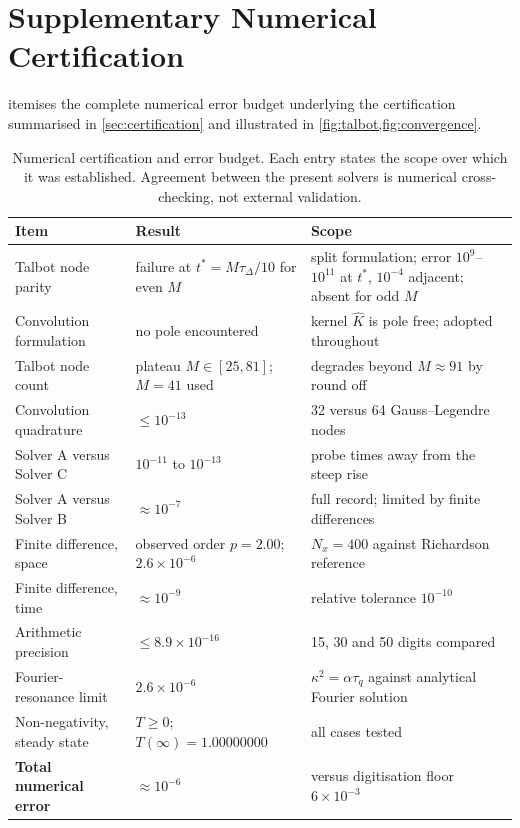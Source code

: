 \documentclass[preprint,12pt,a4paper]{elsarticle}
\theoremstyle{plain}
\theoremstyle{definition}
\theoremstyle{remark}
\newcommand{\tq}{\tau_{q}}
\newcommand{\kk}{\kappa^{2}}
\begin{document}
\clearpage
\section{Supplementary Numerical Certification}
\setcounter{table}{0}
\label{app:certification}

 itemises the complete numerical error budget
underlying the certification summarised in \cref{sec:certification} and
illustrated in \cref{fig:talbot,fig:convergence}.


\begin{table}[htbp]
  \centering
  \caption{Numerical certification and error budget. Each entry states the
           scope over which it was established. Agreement between the present
           solvers is numerical cross-checking, not external validation.}
  \label{tab:certification}
  \small
  \begin{tabularx}{\textwidth}{@{}p{4.3cm}p{3.5cm}X@{}}
    \toprule
    \textbf{Item} & \textbf{Result} & \textbf{Scope} \\
    \midrule
    Talbot node parity
      & failure at $t^{\ast}=M\tau_{\Delta}/10$ for even $M$
      & split formulation; error $10^{9}$--$10^{11}$ at $t^{\ast}$,
        $10^{-4}$ adjacent; absent for odd $M$ \\
    \addlinespace
    Convolution formulation
      & no pole encountered
      & kernel $\hat{K}$ is pole free; adopted throughout \\
    \addlinespace
    Talbot node count
      & plateau $M\in[25,81]$; $M=41$ used
      & degrades beyond $M\approx 91$ by round off \\
    \addlinespace
    Convolution quadrature
      & $\leq 10^{-13}$
      & 32 versus 64 Gauss--Legendre nodes \\
    \addlinespace
    Solver A versus Solver C
      & $10^{-11}$ to $10^{-13}$
      & probe times away from the steep rise \\
    \addlinespace
    Solver A versus Solver B
      & $\approx 10^{-7}$
      & full record; limited by finite differences \\
    \addlinespace
    Finite difference, space
      & observed order $p=2.00$; $2.6\times10^{-6}$
      & $N_{x}=400$ against Richardson reference \\
    \addlinespace
    Finite difference, time
      & $\approx 10^{-9}$
      & relative tolerance $10^{-10}$ \\
    \addlinespace
    Arithmetic precision
      & $\leq 8.9\times10^{-16}$
      & 15, 30 and 50 digits compared \\
    \addlinespace
    Fourier-resonance limit
      & $2.6\times10^{-6}$
      & $\kk=\alpha\tq$ against analytical Fourier solution \\
    \addlinespace
    Non-negativity, steady state
      & $T \geq 0$; $T(\infty)=1.00000000$
      & all cases tested \\
    \addlinespace
    \textbf{Total numerical error}
      & $\approx 10^{-6}$
      & versus digitisation floor $6\times10^{-3}$ \\
    \bottomrule
  \end{tabularx}
\end{table}
\end{document}
